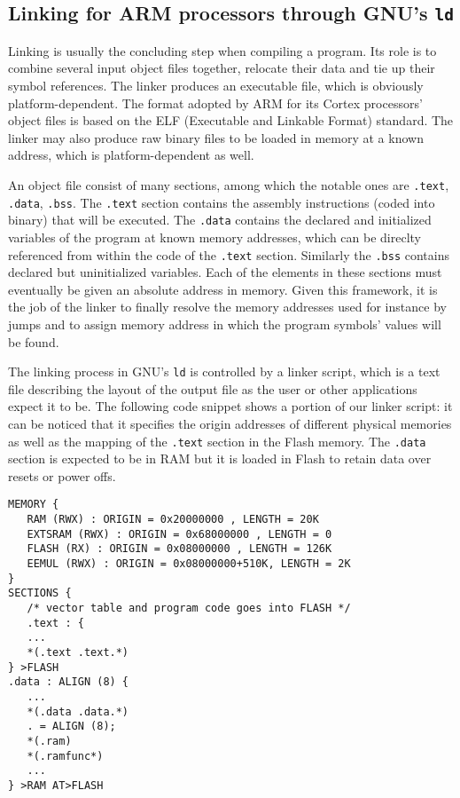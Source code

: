 \documentclass[11pt]{article} %
\begin{document}
\subsection{Linking for ARM processors through GNU's \texttt{ld}}
Linking is usually the concluding step when compiling a program. Its role is to combine several input object files together, relocate their data and tie up their symbol references. The linker produces an executable file, which is obviously platform-dependent. The format adopted by ARM for its Cortex processors' object files is based on the ELF (Executable and Linkable Format) standard. The linker may also produce raw binary files to be loaded in memory at a known address, which is platform-dependent as well.

An object file consist of many sections, among which the notable ones are \texttt{.text}, \texttt{.data}, \texttt{.bss}. The \texttt{.text} section contains the assembly instructions (coded into binary) that will be executed. The \texttt{.data} contains the declared and initialized variables of the program at known memory addresses, which can be direclty referenced from within the code of the \texttt{.text} section. Similarly the \texttt{.bss} contains declared but uninitialized variables. Each of the elements in these sections must eventually be given an absolute address in memory. Given this framework, it is the job of the linker to finally resolve the memory addresses used for instance by jumps and to assign memory address in which the program symbols' values will be found.

The linking process in GNU's \texttt{ld} is controlled by a linker script, which is a text file describing the layout of the output file as the user or other applications expect it to be. The following code snippet shows a portion of our linker script: it can be noticed that it specifies the origin addresses of different physical memories as well as the mapping of the  \texttt{.text} section in the Flash memory. The  \texttt{.data} section is expected to be in RAM but it is loaded in Flash to retain data over resets or power offs.
\\
\begin{verbatim}
MEMORY {
   RAM (RWX) : ORIGIN = 0x20000000 , LENGTH = 20K
   EXTSRAM (RWX) : ORIGIN = 0x68000000 , LENGTH = 0
   FLASH (RX) : ORIGIN = 0x08000000 , LENGTH = 126K
   EEMUL (RWX) : ORIGIN = 0x08000000+510K, LENGTH = 2K
}
SECTIONS {
   /* vector table and program code goes into FLASH */
   .text : {
   ...
   *(.text .text.*)
} >FLASH
.data : ALIGN (8) {
   ...
   *(.data .data.*)
   . = ALIGN (8);
   *(.ram)
   *(.ramfunc*)
   ...
} >RAM AT>FLASH
\end{verbatim}
\end{document}
